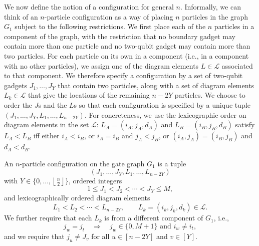 \documentclass[../thesis-main/thesis-main]{subfiles}
\begin{document}
We now define the notion of a configuration for general $n$. Informally, we can think of an $n$-particle configuration as a way of placing $n$ particles in the graph $G_{1}$ subject to the following restrictions. We first place each of the $n$ particles in a component of the graph, with the restriction that no boundary gadget may contain more than one particle and no two-qubit gadget may contain more than two particles. For each particle on its own in a component (i.e., in a component with no other particles), we assign one of the diagram elements $L\in\mathcal{L}$ associated to that component. We therefore specify a configuration by a set of two-qubit gadgets $J_{1},\ldots,J_{Y}$ that contain two particles, along with a set of diagram elements $L_{k}\in\mathcal{L}$ that give the locations of the remaining $n-2Y$ particles. We choose to order the $J$s and the $L$s so that each configuration is specified by a unique tuple $(J_{1},\ldots,J_{Y},L_{1},\ldots,L_{n-2Y})$. For concreteness, we use the lexicographic order on diagram elements in the set $\mathcal{L}$: $L_{A}=(i_{A},j_{A},d_{A})$ and $L_{B}=(i_{B},j_{B},d_{B})$ satisfy $L_{A}<L_{B}$ iff either $i_{A}<i_{B}$, or $i_{A}=i_{B}$ and $j_{A}<j_{B}$, or $(i_{A},j_{A})=(i_{B},j_{B})$ and $d_{A}<d_{B}$.

\begin{definition}
\label{defn:configuration}An $n$-particle configuration on the gate graph $G_{1}$ is a tuple 
\[
(J_{1},\ldots,J_{Y},L_{1},\ldots,L_{n-2Y})
\]
with $Y\in\{0,\ldots,\left\lfloor \frac{n}{2}\right\rfloor \}$, ordered integers
\[
1\leq J_{1}<J_{2}<\cdots<J_{Y}\leq M,
\]
and lexicographically ordered diagram elements 
\[
L_{1}<L_{2}<\cdots<L_{n-2Y},\qquad L_{k}=\left(i_{k},j_{k},d_{k}\right)\in\mathcal{L}.
\]
We further require that each $L_{k}$ is from a different component of $G_{1}$, i.e., 
\[
j_{w}=j_{t}\quad\Longrightarrow\quad j_{w}\in\{0,M+1\}\text{ and }i_{w}\neq i_{t},
\]
and we require that $j_{u}\neq J_{v}$ for all $u\in[n-2Y]$ and $v\in[Y]$.
\end{definition}
\end{document}
